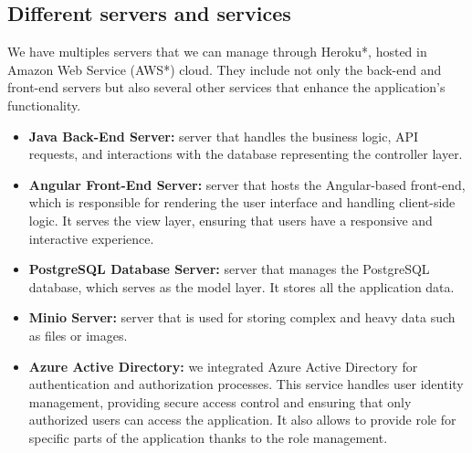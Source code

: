 \documentclass[12pt,a4paper,table,english]{article}
\begin{document}
	
	\subsection{Different servers and services}
	
	We have multiples servers that we can manage through Heroku*, hosted in Amazon Web Service (AWS*) cloud. They include not only the back-end and front-end servers but also several other services that enhance the application's functionality.
	
	\begin{itemize}
		\item \textbf{Java Back-End Server:} server that handles the business logic, API requests, and interactions with the database representing the controller layer.
		
		\item \textbf{Angular Front-End Server:} server that hosts the Angular-based front-end, which is responsible for rendering the user interface and handling client-side logic. It serves the view layer, ensuring that users have a responsive and interactive experience.
		
		\item \textbf{PostgreSQL Database Server:} server that manages the PostgreSQL database, which serves as the model layer. It stores all the application data.
		
		\item \textbf{Minio Server:} server that is used for storing complex and heavy data such as files or images.
		
		\item \textbf{Azure Active Directory:} we integrated Azure Active Directory for authentication and authorization processes. This service handles user identity management, providing secure access control and ensuring that only authorized users can access the application. It also allows to provide role for specific parts of the application thanks to the role management.
		
	\end{itemize}

	
	
	
\end{document}

